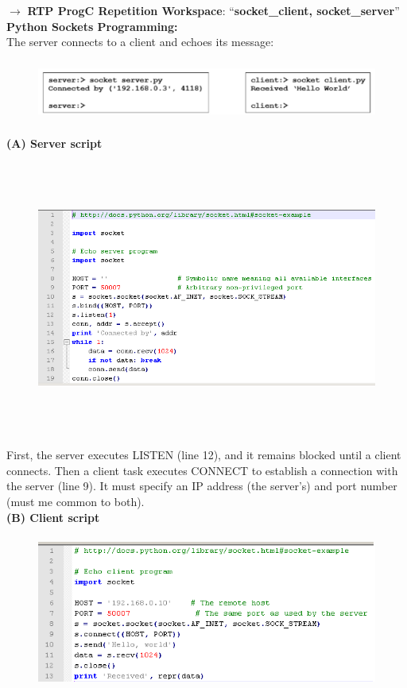 $\rightarrow$ \textbf{ RTP ProgC Repetition Workspace}: ``\textbf{socket\_client, socket\_server}''\\

{\rot\bf Python Sockets Programming:}\\

The server connects to a client and echoes its message:

 	\begin{figure}[h]
    \centering
    \includegraphics[width=14cm, height=2cm]{Images/image188.png}
    \label{fig:Fig }
    \end{figure}
\newpage  
\textbf{(A) Server script }

 	\begin{figure}[h]
    \centering
    \includegraphics[width=16cm, height=9cm]{Images/image20.png}
    \label{fig:Fig }
    \end{figure}
   
First, the server executes LISTEN (line 12), and it remains blocked until a client connects. Then a client task executes CONNECT to establish a connection with the server (line 9). It must specify an IP address (the server's) and port number (must me common to both).\\

\textbf{(B) Client script }

 	\begin{figure}[h]
    \centering
    \includegraphics[width=16cm, height=5cm]{Images/image118.png}
    \label{fig:Fig }
    \end{figure}

